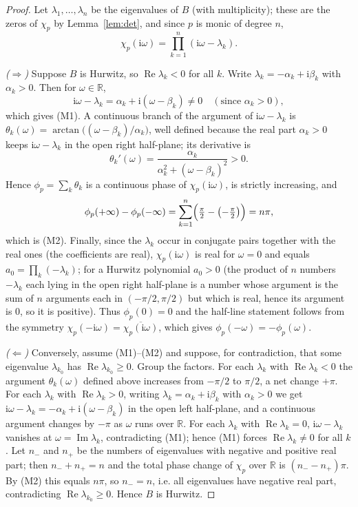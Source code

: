 \documentclass[12pt]{article}
\theoremstyle{definition}
\DeclareMathOperator{\Real}{Re}
\DeclareMathOperator{\Imag}{Im}
\newcommand{\jj}{\mathrm{i}}
\begin{document}
\begin{proof}
Let $\lambda_1,\dots,\lambda_n$ be the eigenvalues of $B$ (with multiplicity); these are
the zeros of $\chi_p$ by Lemma~\ref{lem:det}, and since $p$ is monic of degree $n$,
\[
\chi_p(\jj\omega)=\prod_{k=1}^n(\jj\omega-\lambda_k).
\]

\emph{($\Rightarrow$)} Suppose $B$ is Hurwitz, so $\Real\lambda_k<0$ for all $k$. Write
$\lambda_k=-\alpha_k+\jj\beta_k$ with $\alpha_k>0$. Then for $\omega\in\mathbb R$,
\[
\jj\omega-\lambda_k=\alpha_k+\jj(\omega-\beta_k)\ne0\quad(\text{since }\alpha_k>0),
\]
which gives (M1). A continuous branch of the argument of $\jj\omega-\lambda_k$ is
$\theta_k(\omega)=\arctan\!\big((\omega-\beta_k)/\alpha_k\big)$, well defined because the
real part $\alpha_k>0$ keeps $\jj\omega-\lambda_k$ in the open right half-plane; its
derivative is
\[
\theta_k'(\omega)=\frac{\alpha_k}{\alpha_k^2+(\omega-\beta_k)^2}>0 .
\]
Hence $\phi_p=\sum_k\theta_k$ is a continuous phase of $\chi_p(\jj\omega)$, is strictly
increasing, and
\[
\phi_p(+\infty)-\phi_p(-\infty)=\sum_{k=1}^n\Bigl(\tfrac{\pi}{2}-\bigl(-\tfrac{\pi}{2}
\bigr)\Bigr)=n\pi,
\]
which is (M2). Finally, since the $\lambda_k$ occur in conjugate pairs together with the
real ones (the coefficients are real), $\chi_p(\jj\omega)$ is real for $\omega=0$ and equals
$a_0=\prod_k(-\lambda_k)$; for a Hurwitz polynomial $a_0>0$ (the product of $n$ numbers
$-\lambda_k$ each lying in the open right half-plane is a number whose argument is the sum
of $n$ arguments each in $(-\pi/2,\pi/2)$ but which is real, hence its argument is $0$, so
it is positive). Thus $\phi_p(0)=0$ and the half-line statement follows from the symmetry
$\chi_p(-\jj\omega)=\overline{\chi_p(\jj\omega)}$, which gives $\phi_p(-\omega)=-\phi_p(\omega)$.

\emph{($\Leftarrow$)} Conversely, assume (M1)–(M2) and suppose, for contradiction, that some
eigenvalue $\lambda_{k_0}$ has $\Real\lambda_{k_0}\ge0$. Group the factors. For each
$\lambda_k$ with $\Real\lambda_k<0$ the argument $\theta_k(\omega)$ defined above increases
from $-\pi/2$ to $\pi/2$, a net change $+\pi$. For each $\lambda_k$ with
$\Real\lambda_k>0$, writing $\lambda_k=\alpha_k+\jj\beta_k$ with $\alpha_k>0$ we get
$\jj\omega-\lambda_k=-\alpha_k+\jj(\omega-\beta_k)$ in the open left half-plane, and a
continuous argument changes by $-\pi$ as $\omega$ runs over $\mathbb R$. For each
$\lambda_k$ with $\Real\lambda_k=0$, $\jj\omega-\lambda_k$ vanishes at $\omega=\Imag
\lambda_k$, contradicting (M1); hence (M1) forces $\Real\lambda_k\ne0$ for all $k$. Let
$n_-$ and $n_+$ be the numbers of eigenvalues with negative and positive real part; then
$n_-+n_+=n$ and the total phase change of $\chi_p$ over $\mathbb R$ is
$(n_--n_+)\pi$. By (M2) this equals $n\pi$, so $n_-=n$, i.e. all eigenvalues have negative
real part, contradicting $\Real\lambda_{k_0}\ge0$. Hence $B$ is Hurwitz.
\end{proof}
\end{document}
